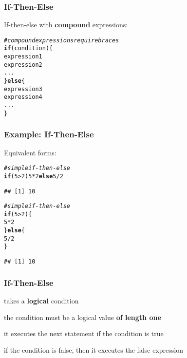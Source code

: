 \documentclass[12pt]{beamer}\usepackage[]{graphicx}\usepackage[]{color}
\makeatletter
\newcommand{\hlnum}[1]{\textcolor[rgb]{0.686,0.059,0.569}{#1}}%
\newcommand{\hlcom}[1]{\textcolor[rgb]{0.678,0.584,0.686}{\textit{#1}}}%
\newcommand{\hlopt}[1]{\textcolor[rgb]{0,0,0}{#1}}%
\newcommand{\hlstd}[1]{\textcolor[rgb]{0.345,0.345,0.345}{#1}}%
\newcommand{\hlkwa}[1]{\textcolor[rgb]{0.161,0.373,0.58}{\textbf{#1}}}%
\newenvironment{kframe}{%
 \def\at@end@of@kframe{}%
 \ifinner\ifhmode%
  \def\at@end@of@kframe{\end{minipage}}%
  \begin{minipage}{\columnwidth}%
 \fi\fi%
 \def\FrameCommand##1{\hskip\@totalleftmargin \hskip-\fboxsep
 \colorbox{shadecolor}{##1}\hskip-\fboxsep
     \hskip-\linewidth \hskip-\@totalleftmargin \hskip\columnwidth}%
 \MakeFramed {\advance\hsize-\width
   \@totalleftmargin\z@ \linewidth\hsize
   \@setminipage}}%
 {\par\unskip\endMakeFramed%
 \at@end@of@kframe}
\newenvironment{knitrout}{}{} %
\makeatother
\begin{document}
\begin{frame}[fragile]
\frametitle{If-Then-Else}

If-then-else with \textbf{compound} expressions:

\begin{knitrout}\footnotesize
{}\color{fgcolor}\begin{kframe}
\begin{alltt}
\hlcom{# compound expressions require braces}
\hlkwa{if} \hlstd{(condition) \{}
  \hlstd{expression1}
  \hlstd{expression2}
  \hlstd{...}
\hlstd{\}} \hlkwa{else} \hlstd{\{}
  \hlstd{expression3}
  \hlstd{expression4}
  \hlstd{...}
\hlstd{\}}
\end{alltt}
\end{kframe}
\end{knitrout}

\end{frame}


\begin{frame}[fragile]
\frametitle{Example: If-Then-Else}

Equivalent forms:
\begin{knitrout}\footnotesize
{}\color{fgcolor}\begin{kframe}
\begin{alltt}
\hlcom{# simple if-then-else}
\hlkwa{if} \hlstd{(}\hlnum{5} \hlopt{>} \hlnum{2}\hlstd{)} \hlnum{5} \hlopt{*} \hlnum{2} \hlkwa{else} \hlnum{5} \hlopt{/} \hlnum{2}
\end{alltt}
\begin{verbatim}
## [1] 10
\end{verbatim}
\begin{alltt}
\hlcom{# simple if-then-else}
\hlkwa{if} \hlstd{(}\hlnum{5} \hlopt{>} \hlnum{2}\hlstd{) \{}
  \hlnum{5} \hlopt{*} \hlnum{2}
\hlstd{\}} \hlkwa{else} \hlstd{\{}
  \hlnum{5} \hlopt{/} \hlnum{2}
\hlstd{\}}
\end{alltt}
\begin{verbatim}
## [1] 10
\end{verbatim}
\end{kframe}
\end{knitrout}

\end{frame}


\begin{frame}
\frametitle{If-Then-Else}

\bi
  \item {\hilit {}} takes a \textbf{logical} condition
  \item the condition must be a logical value \textbf{of length one}
  \item it executes the next statement if the condition is true
  \item if the condition is false, then it executes the false expression
\ei

\end{frame}
\end{document}
